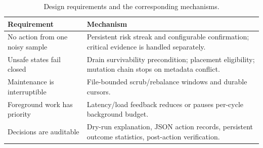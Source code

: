 \begin{table}[t]
  \centering
  \small
  \caption{Design requirements and the corresponding \autopilot{} mechanisms.}
  \label{tab:design-properties}
  \begin{tabularx}{\columnwidth}{@{}p{}X@{}}
    \toprule
    Requirement & Mechanism \\
    \midrule
    No action from one noisy sample & Persistent risk streak and configurable confirmation; critical evidence is handled separately. \\
    Unsafe states fail closed & Drain survivability precondition; placement eligibility; mutation chain stops on metadata conflict. \\
    Maintenance is interruptible & File-bounded scrub/rebalance windows and durable cursors. \\
    Foreground work has priority & Latency/load feedback reduces or pauses per-cycle background budget. \\
    Decisions are auditable & Dry-run explanation, JSON action records, persistent outcome statistics, post-action verification. \\
    \bottomrule
  \end{tabularx}
\end{table}
